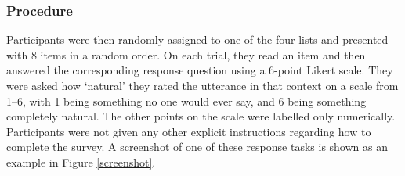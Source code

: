 \documentclass[titlepage,12pt]{article}
\begin{document}



\subsubsection{Procedure}

Participants were then randomly assigned to one of the four lists and presented with 8 items in a random order. On each trial, they read an item and then answered the corresponding response question using a 6-point Likert scale. They were asked how `natural' they rated the utterance in that context on a scale from 1--6, with 1 being something no one would ever say, and 6 being something completely natural. The other points on the scale were labelled only numerically. Participants were not given any other explicit instructions regarding how to complete the survey. A screenshot of one of these response tasks is shown as an example in Figure \ref{screenshot}.
\end{document}
